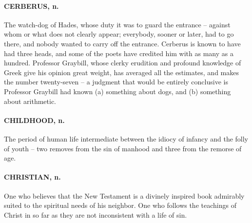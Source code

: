 \documentclass[11pt]{article}
\begin{document}
\paragraph{CERBERUS, n.}  The watch-dog of Hades, whose duty it was to guard the
entrance -- against whom or what does not clearly appear; everybody,
sooner or later, had to go there, and nobody wanted to carry off the
entrance.  Cerberus is known to have had three heads, and some of the
poets have credited him with as many as a hundred.  Professor
Graybill, whose clerky erudition and profound knowledge of Greek give
his opinion great weight, has averaged all the estimates, and makes
the number twenty-seven -- a judgment that would be entirely
conclusive is Professor Graybill had known (a) something about dogs,
and (b) something about arithmetic.

\paragraph{CHILDHOOD, n.}  The period of human life intermediate between the
idiocy of infancy and the folly of youth -- two removes from the sin
of manhood and three from the remorse of age.

\paragraph{CHRISTIAN, n.}  One who believes that the New Testament is a divinely
inspired book admirably suited to the spiritual needs of his neighbor.
One who follows the teachings of Christ in so far as they are not
inconsistent with a life of sin.
\end{document}
